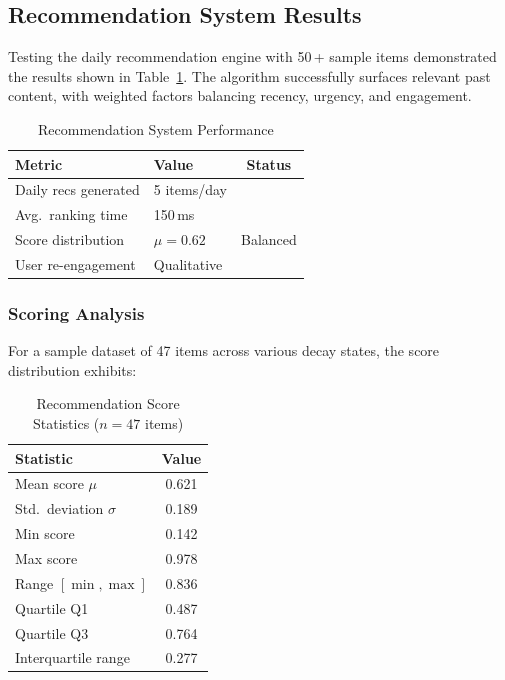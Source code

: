 \documentclass[10pt,twocolumn,a4paper]{article}
\newcommand{\cmark}{\ding{51}}
\begin{document}
\subsection{Recommendation System Results}

Testing the daily recommendation engine with 50\,+ sample items demonstrated the results
shown in Table~\ref{tab:recsys}. The algorithm successfully surfaces relevant past content,
with weighted factors balancing recency, urgency, and engagement.

\begin{table}[h]
\centering
\caption{Recommendation System Performance}
\label{tab:recsys}
\small
\begin{tabular}{|l|l|c|}
\hline
\textbf{Metric}      & \textbf{Value}   & \textbf{Status} \\
\hline
Daily recs generated & 5 items/day      & \cmark \\
Avg.\ ranking time   & 150\,ms          & \cmark \\
Score distribution   & $\mu = 0.62$     & Balanced \\
User re-engagement   & Qualitative      & \cmark \\
\hline
\end{tabular}
\end{table}

\subsubsection{Scoring Analysis}

For a sample dataset of 47 items across various decay states, the score distribution exhibits:

\begin{table}[h]
\centering
\caption{Recommendation Score Statistics ($n=47$ items)}
\label{tab:score_stats}
\small
\begin{tabular}{|l|c|}
\hline
\textbf{Statistic}      & \textbf{Value} \\
\hline
Mean score $\mu$        & 0.621 \\
Std.\ deviation $\sigma$ & 0.189 \\
Min score               & 0.142 \\
Max score               & 0.978 \\
Range $[\min, \max]$    & 0.836 \\
Quartile Q1             & 0.487 \\
Quartile Q3             & 0.764 \\
Interquartile range     & 0.277 \\
\hline
\end{tabular}
\end{table}
\end{document}
